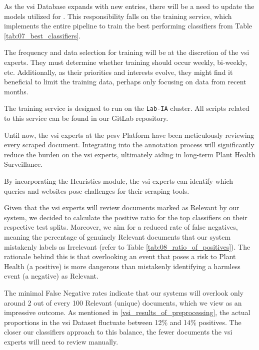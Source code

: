 \label{08_training_service}

As the \gls{vsi} Database expands with new entries, there will be a need to update the models utilized for \textclassification{}. This responsibility falls on the training service, which implements the entire pipeline to train the best performing classifiers from Table \ref{tab:07_best_classifiers}.

The frequency and data selection for training will be at the discretion of the \gls{vsi} experts. They must determine whether training should occur weekly, bi-weekly, etc. Additionally, as their priorities and interests evolve, they might find it beneficial to limit the training data, perhaps only focusing on data from recent months.

The training service is designed to run on the \texttt{Lab-IA} cluster. All scripts related to this service can be found in our GitLab repository.



\label{08_consequences}


Until now, the \gls{vsi} experts at the \gls{pesv} Platform have been meticulously reviewing every scraped document. 
Integrating \textclassification{} into the annotation process will significantly reduce the burden on the \gls{vsi} experts, ultimately aiding in long-term Plant Health Surveillance.

By incorporating the Heuristics module, the \gls{vsi} experts can identify which queries and websites pose challenges for their scraping tools.

Given that the \gls{vsi} experts will review documents marked as Relevant by our system, we decided to calculate the positive ratio for the top classifiers on their respective test splits. Moreover, we aim for a reduced rate of false negatives, meaning the percentage of genuinely Relevant documents that our system mistakenly labels as Irrelevant (refer to Table \ref{tab:08_ratio_of_positives}). The rationale behind this is that overlooking an event that poses a risk to Plant Health (a positive) is more dangerous than mistakenly identifying a harmless event (a negative) as Relevant.



The minimal False Negative rates indicate that our systems will overlook only around 2 out of every 100 Relevant (unique) documents, which we view as an impressive outcome. 
As mentioned in \headerName{} \ref{vsi_results_of_preprocessing}, the actual  proportions in the \gls{vsi} Dataset fluctuate between 12\% and 14\% positives. The closer our classifiers approach to this balance, the fewer documents the \gls{vsi} experts will need to review manually.

